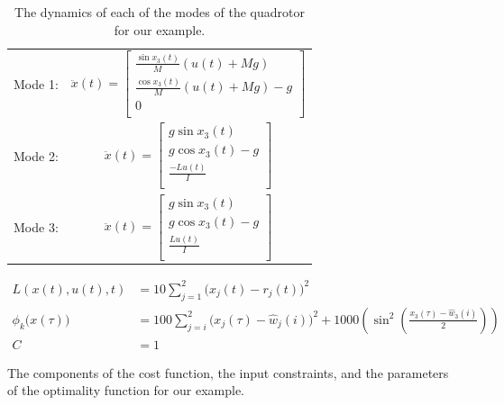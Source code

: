 \begin{table}[t]
  \begin{center}
    \begin{tabular}{cc}
      Mode 1: & 
      $\ddot{x}(t) = \begin{bmatrix} \frac{\sin x_3(t)}{M}\left( u(t) + Mg \right) \\	\frac{\cos x_3(t)}{M}\left( u(t) + Mg \right) - g \\ 0 \\ \end{bmatrix}$ \\
      Mode 2: & 
      $\ddot{x}(t) = \begin{bmatrix} g\sin x_3(t) \\ g\cos x_3(t) - g \\ \frac{-L u(t)}{I} \\ \end{bmatrix}$ \\
      Mode 3: &
      $\ddot{x}(t) = \begin{bmatrix} g\sin x_3(t) \\	g\cos x_3(t) - g \\ \frac{L u(t)}{I} \\ \end{bmatrix}$ \\
    \end{tabular}
  \end{center}
  \caption{The dynamics of each of the modes of the quadrotor for our example.}
  \label{tab:ocp_dynamics} 
\end{table}

\begin{table}[t]
  \begin{center}
    \begin{align*}
      L(x(t),u(t),t) &= 10 \sum_{j=1}^2 \big(x_j(t) - r_j(t) \big)^2 \\
      \phi_k \big( x( \tau ) \big) &= 100 \sum_{j=i}^2 \big( x_j(\tau) - \hat{w}_j(i) \big)^2 + 1000 \left( \sin^2 \left( \frac{x_3(\tau) - \hat{w}_3(i)}{2} \right) \right) \\
      C &= 1
    \end{align*}
  \end{center}
  \caption{The components of the cost function, the input constraints, and the parameters of the optimality function for our example.}
  \label{tab:ocp_cost}
\end{table}


